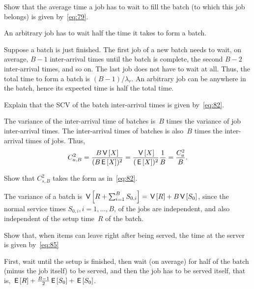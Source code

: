 \documentclass[stochastic-or.tex]{subfiles}
\begin{document}
\begin{exercise}\label{ex:48}
  Show that the average time a job has to wait to fill the batch (to which this job belongs) is given by~\cref{eq:79}.
\begin{hint}
An arbitrary job has to wait half the time it takes  to form a batch.
 \end{hint}
\begin{solution}
  Suppose a batch is just finished.
  The first job of a new batch needs to wait, on average, $B-1$ inter-arrival times until the batch is complete, the second $B-2$ inter-arrival times, and so on.
  The last job does not have to wait at all.
  Thus, the total time to form a batch is $(B-1)/\lambda_r$.
  An arbitrary job can be anywhere in the batch, hence its expected time is half the total time.
\end{solution}
\end{exercise}


\begin{exercise}\label{ex:490}
Explain that the SCV of the batch inter-arrival times is given by~\cref{eq:82}.
\begin{solution}
The variance of the inter-arrival time of batches is~$B$ times the variance of job inter-arrival times. The inter-arrival times of batches is also~$B$ times the inter-arrival times of jobs. Thus,
\begin{equation*}
 C_{a,B}^2 = \frac{B \,\mathsf{V}\left[X\right]}{(B \,\mathsf{E}\left[X\right])^2} = \frac{\,\mathsf{V}\left[X\right]}{(\,\mathsf{E}\left[X\right])^2} \frac 1 B = \frac{C_a^2}{B}.
\end{equation*}
\end{solution}
\end{exercise}


\begin{exercise}\label{ex:491}
Show that $C_{s,B}^2$ takes the form as in~\cref{eq:82}.
\begin{solution}
 The variance of a batch is $\,\mathsf{V}\left[R+\sum_{i=1}^B S_{0,i} \right] = \,\mathsf{V}\left[R\right] + B\,\mathsf{V}\left[S_0\right]$, since the normal service times $S_{0,i}, i=1,\ldots,B$, of the jobs are independent, and also independent of the setup time~$R$ of the batch.
\end{solution}
\end{exercise}

\begin{exercise}\label{ex:492}
Show that, when items can leave right after being served, the time at the server is given by~\cref{eq:85}
\begin{solution}
 First, wait until the setup is finished, then wait (on average) for half of the batch (minus the job itself) to be served, and then the job has to be served itself, that is,
$\,\mathsf{E}\left[R\right] + \frac{B-1}{2}\,\mathsf{E}\left[S_0\right] +\,\mathsf{E}\left[S_0\right]$.
\end{solution}
\end{exercise}




\end{document}

